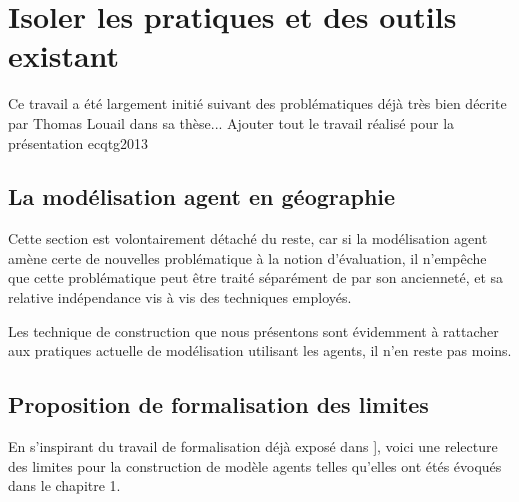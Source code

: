 {\section {Isoler les pratiques et des outils existant} 

Ce travail a été largement initié suivant des problématiques déjà très bien décrite par Thomas Louail dans sa thèse...
Ajouter tout le travail réalisé pour la présentation ecqtg2013

\subsection {La modélisation agent en géographie} 

Cette section est volontairement détaché du reste, car si la modélisation agent amène certe de nouvelles problématique à la notion d'évaluation, il n'empêche que cette problématique peut être traité séparément de par son ancienneté, et sa relative indépendance vis à vis des techniques employés.

Les technique de construction que nous présentons sont évidemment à rattacher aux pratiques actuelle de modélisation utilisant les agents, il n'en reste pas moins.


\subsection{Proposition de formalisation des limites} 

En s'inspirant du travail de formalisation déjà exposé dans \autocite[120]{Louail2010}], voici une relecture des limites pour la construction de modèle agents telles qu'elles ont étés évoqués dans le chapitre 1.


}
